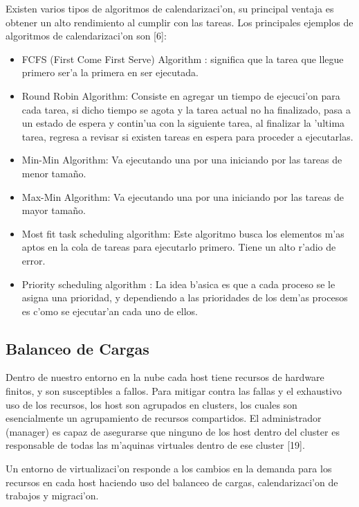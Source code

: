 Existen varios tipos de algoritmos de calendarizaci'on, su principal ventaja es obtener un alto rendimiento al cumplir con las tareas. Los principales ejemplos de algoritmos de calendarizaci'on son [6]:

\begin{itemize}
\item FCFS (First Come First Serve) Algorithm : significa que la tarea que llegue primero ser'a la primera en ser ejecutada.
\item Round Robin Algorithm: Consiste en agregar un tiempo de ejecuci'on para cada tarea, si dicho tiempo se agota y la tarea actual no ha finalizado, pasa a un estado de espera y contin'ua con la siguiente tarea, al finalizar la 'ultima tarea, regresa a revisar si existen tareas en espera para proceder a ejecutarlas. 
\item Min-Min Algorithm: Va ejecutando una por una iniciando por las tareas de menor tamaño.
\item Max-Min Algorithm: Va ejecutando una por una iniciando por las tareas de mayor tamaño.
\item Most fit task scheduling algorithm: Este algoritmo busca los elementos m'as aptos en la cola de tareas para ejecutarlo primero. Tiene un alto r'adio de error.
\item Priority scheduling algorithm : La idea b'asica es que a cada proceso se le asigna una prioridad, y dependiendo a las prioridades de los dem'as procesos es c'omo se ejecutar'an cada uno de ellos.
\end{itemize}

\subsection*{Balanceo de Cargas}

Dentro de nuestro entorno en la nube cada host tiene recursos de hardware finitos, y son susceptibles a fallos. Para mitigar contra las fallas y el exhaustivo uso de los recursos, los host son agrupados en clusters, los cuales son esencialmente un agrupamiento de recursos compartidos. El administrador (manager) es capaz de asegurarse que ninguno de los host dentro del cluster es responsable de todas las m'aquinas virtuales dentro de ese cluster [19].

Un entorno de virtualizaci'on responde a los cambios en la demanda para los recursos en cada host haciendo uso del balanceo de cargas, calendarizaci'on de trabajos y migraci'on.

